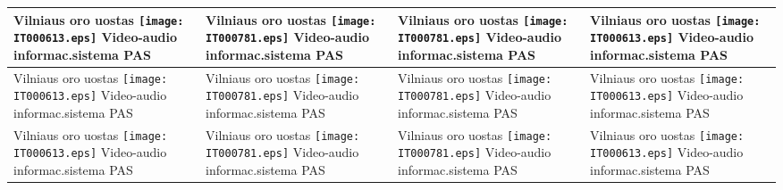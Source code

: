 \documentclass[a4paper,12pt]{article}
\begin{document}
\begin{supertabular}{|p{4.2cm}|p{4.2cm}|p{4.2cm}|p{4.2cm}|}
Vilniaus oro uostas \newline \texttt{[image: IT000613.eps]} \newline Video-audio informac.sistema \newline \footnotesize {PAS} & Vilniaus oro uostas \newline \texttt{[image: IT000781.eps]} \newline Video-audio informac.sistema \newline \footnotesize {PAS} & Vilniaus oro uostas \newline \texttt{[image: IT000781.eps]} \newline Video-audio informac.sistema \newline \footnotesize {PAS} & Vilniaus oro uostas \newline \texttt{[image: IT000613.eps]} \newline Video-audio informac.sistema \newline \footnotesize {PAS} \\\hline
Vilniaus oro uostas \newline \texttt{[image: IT000613.eps]} \newline Video-audio informac.sistema \newline \footnotesize {PAS} & Vilniaus oro uostas \newline \texttt{[image: IT000781.eps]} \newline Video-audio informac.sistema \newline \footnotesize {PAS} & Vilniaus oro uostas \newline \texttt{[image: IT000781.eps]} \newline Video-audio informac.sistema \newline \footnotesize {PAS} & Vilniaus oro uostas \newline \texttt{[image: IT000613.eps]} \newline Video-audio informac.sistema \newline \footnotesize {PAS} \\\hline
Vilniaus oro uostas \newline \texttt{[image: IT000613.eps]} \newline Video-audio informac.sistema \newline \footnotesize {PAS} & Vilniaus oro uostas \newline \texttt{[image: IT000781.eps]} \newline Video-audio informac.sistema \newline \footnotesize {PAS} & Vilniaus oro uostas \newline \texttt{[image: IT000781.eps]} \newline Video-audio informac.sistema \newline \footnotesize {PAS} & Vilniaus oro uostas \newline \texttt{[image: IT000613.eps]} \newline Video-audio informac.sistema \newline \footnotesize {PAS} \\\hline

\end{supertabular}
\end{document}
